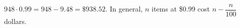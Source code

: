 $948\cdot0.99=948-9.48=\boxed{\$938.52}$. In general, $n$ items at \$0.99 cost $n-\dfrac n{100}$ dollars.
